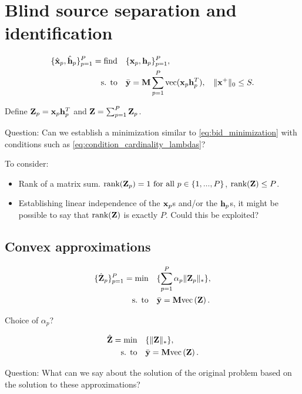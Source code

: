 \documentclass{article}
\def\Z{{\mathbf Z}}
\def\M{{\mathbf M}}
\def\x{{\mathbf x}}
\def\y{{\mathbf y}}
\def\h{{\mathbf h}}
\begin{document}
\section*{Blind source separation and identification}

\begin{align}
\label{eq:bss_feasibility}
   \{\hbx_p,\hbh_p\}_{p=1}^{P}=\text{find} \quad &\{\x_p,\h_p\}_{p=1}^{P}, \\
  \text{s. to} \quad & \bar{\y} = \bbM \sum_{p=1}^{P} \text{vec}(\x_p \h_p^T), \;\; \|\x^+\|_0 \leq S. \nonumber
\end{align}

\noindent
Define ${\mathbf Z}_p = {\mathbf x}_p{\mathbf h}_p^T$ and ${\mathbf Z} = \sum_{p=1}^P {\mathbf Z}_p$.

\noindent
Question: Can we establish a minimization similar to \eqref{eq:bid_minimization} with conditions such as \eqref{eq:condition_cardinality_lambdas}?

\noindent
To consider:
\begin{itemize}
  \item Rank of a matrix sum. $\text{rank}({\mathbf Z}_p)=1 \ \text{\normalfont for all} \ p \in \{1,...,P\}$, $\text{rank}({\mathbf Z}) \leq P$.
  \item Establishing linear independence of the ${\mathbf x}_p$s and/or the ${\mathbf h}_p$s, it might be possible to say that $\text{rank}({\mathbf Z})$ is exactly $P$. Could this be exploited?
\end{itemize}

\subsection*{Convex approximations}

\begin{align}
\label{eq:bss_convex_minimization2}
   \{\hbZ_p\}_{p=1}^{P} =\text{min} \quad &\{\sum_{p=1}^P \alpha_p \|\Z_p\|_{*}\}, \\
  \text{s. to} \quad & \bar{\y} = \M \text{vec}\left(\Z\right). \nonumber
\end{align}

\noindent
Choice of $\alpha_p$?

\begin{align}
\label{eq:bss_convex_minimization1}
   \hbZ =\text{min} \quad &\{\|\Z\|_{*}\}, \\
  \text{s. to} \quad & \bar{\y} = \M \text{vec}\left(\Z\right). \nonumber
\end{align}

\noindent
Question: What can we say about the solution of the original problem based on the solution to these approximations?
\end{document}
